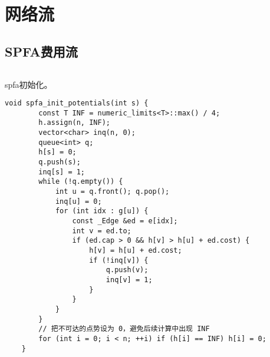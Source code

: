 \documentclass[a4paper]{report}
\newcommand{\cppcode}[1]{  
    \inputminted[mathescape]{cpp}{source/#1}  
}
\begin{document}
\chapter{网络流}
\section{SPFA费用流}
\cppcode{费用流.cpp}
spfa初始化。
\begin{verbatim}
void spfa_init_potentials(int s) {
        const T INF = numeric_limits<T>::max() / 4;
        h.assign(n, INF);
        vector<char> inq(n, 0);
        queue<int> q;
        h[s] = 0;
        q.push(s);
        inq[s] = 1;
        while (!q.empty()) {
            int u = q.front(); q.pop();
            inq[u] = 0;
            for (int idx : g[u]) {
                const _Edge &ed = e[idx];
                int v = ed.to;
                if (ed.cap > 0 && h[v] > h[u] + ed.cost) {
                    h[v] = h[u] + ed.cost;
                    if (!inq[v]) {
                        q.push(v);
                        inq[v] = 1;
                    }
                }
            }
        }
        // 把不可达的点势设为 0，避免后续计算中出现 INF
        for (int i = 0; i < n; ++i) if (h[i] == INF) h[i] = 0;
    }
\end{verbatim}
\end{document}
